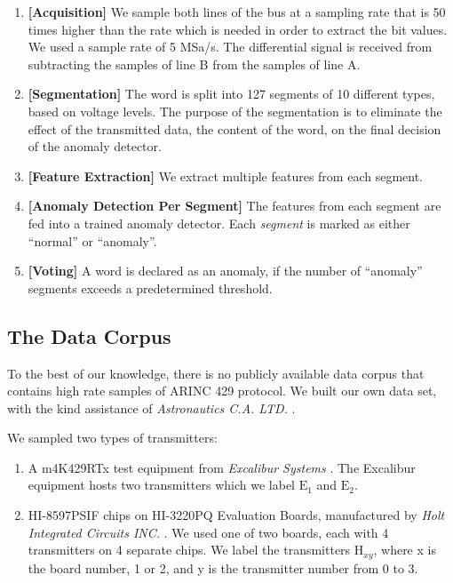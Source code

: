 \documentclass[conference]{IEEEtran}
\begin{document}
  \begin{enumerate}
    \item \textbf{[Acquisition]}
          We sample both lines of the bus at a sampling rate that is 50 times higher than the rate which is needed in order to extract the bit values. We used a sample rate of 5 MSa/s. The differential signal is received from subtracting the samples of line B from the samples of line A.
    \item \textbf{[Segmentation]}
          The word is split into 127 segments of 10 different types, based on voltage levels. The purpose of the segmentation is to eliminate the effect of the transmitted data, the content of the word, on the final decision of the anomaly detector.
    \item \textbf{[Feature Extraction]}
          We extract multiple features from each segment. 
    \item \textbf{[Anomaly Detection Per Segment]}
          The features from each segment are fed into a trained anomaly detector. Each \textit{segment} is marked as either ``normal'' or ``anomaly''.
    \item \textbf{[Voting]}
          A word is declared as an anomaly, if the number of ``anomaly'' segments exceeds a predetermined threshold.
  \end{enumerate}
  
\subsection{The Data Corpus}
  To the best of our knowledge, there is no publicly available data corpus that contains high rate samples of ARINC 429 protocol. We built our own data set, with the kind assistance of \textit{Astronautics C.A. LTD.} \cite{}.
  
  We sampled two types of transmitters:
  \begin{enumerate}
     \item A m4K429RTx test equipment from \textit{Excalibur Systems} \cite{}. The Excalibur equipment hosts two transmitters which we label \(\text{E}_1\) and \(\text{E}_2\).
     \item HI-8597PSIF chips on HI-3220PQ Evaluation Boards, manufactured by \textit{Holt Integrated Circuits INC.} \cite{}. We used one of two boards, each with 4 transmitters on 4 separate chips. We label the transmitters \(\text{H}_{xy}\), where x is the board number, 1 or 2, and y is the transmitter number from 0 to 3.
  \end{enumerate}
  
\end{document}
